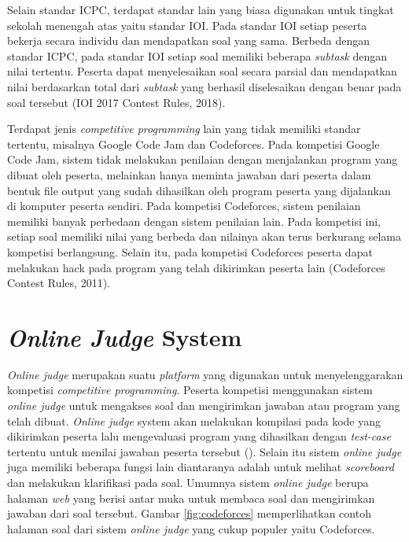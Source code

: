 \par Selain standar ICPC, terdapat standar lain yang biasa digunakan untuk tingkat sekolah menengah atas yaitu standar IOI. Pada standar IOI setiap peserta bekerja secara individu dan mendapatkan soal yang sama. Berbeda dengan standar ICPC, pada standar IOI setiap soal memiliki beberapa \textit{subtask} dengan nilai tertentu. Peserta dapat menyelesaikan soal secara parsial dan mendapatkan nilai berdasarkan total dari \textit{subtask} yang berhasil diselesaikan dengan benar pada soal tersebut (IOI 2017 Contest Rules, 2018).
\par Terdapat jenis \textit{competitive programming} lain yang tidak memiliki standar tertentu, misalnya Google Code Jam dan Codeforces. Pada kompetisi Google Code Jam, sistem tidak melakukan penilaian dengan menjalankan program yang dibuat oleh peserta, melainkan hanya meminta jawaban dari peserta dalam bentuk file output yang sudah dihasilkan oleh program peserta yang dijalankan di komputer peserta sendiri. Pada kompetisi Codeforces, sistem penilaian memiliki banyak perbedaan dengan sistem penilaian lain. Pada kompetisi ini, setiap soal memiliki nilai yang berbeda dan nilainya akan terus berkurang selama kompetisi berlangsung. Selain itu, pada kompetisi Codeforces peserta dapat melakukan hack pada program yang telah dikirimkan peserta lain (Codeforces Contest Rules, 2011).

\section{\textit{Online Judge} System}

\par \textit{Online judge} merupakan suatu \textit{platform} yang digunakan untuk menyelenggarakan kompetisi \textit{competitive programming}. Peserta kompetisi menggunakan sistem \textit{online judge} untuk mengakses soal dan mengirimkan jawaban atau program yang telah dibuat. \textit{Online judge} system akan melakukan kompilasi pada kode yang dikirimkan peserta lalu mengevaluasi program yang dihasilkan dengan \textit{test-case} tertentu untuk menilai jawaban peserta tersebut (\cite{wasikojsurvey}). Selain itu sistem \textit{online judge} juga memiliki beberapa fungsi lain diantaranya adalah untuk melihat \textit{scoreboard} dan melakukan klarifikasi pada soal. Umumnya sistem \textit{online judge} berupa halaman \textit{web} yang berisi antar muka untuk membaca soal dan mengirimkan jawaban dari soal tersebut. Gambar \ref{fig:codeforces} memperlihatkan contoh halaman soal dari sistem \textit{online judge} yang cukup populer yaitu Codeforces.

